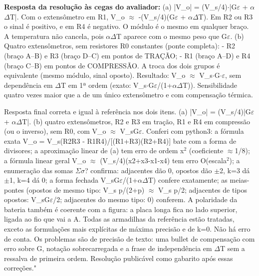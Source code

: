\documentclass{article}%
\begin{document}
\textbf{Resposta da resolução às cegas do avaliador:} (a) |V\_o| = (V\_s/4)$\cdot$|G$\varepsilon$ + $\alpha$$\Delta$T|. Com o extensômetro em R1, V\_o $\approx$ -(V\_s/4)(G$\varepsilon$ + $\alpha$$\Delta$T). Em R2 ou R3 o sinal é positivo, e em R4 é negativo. O módulo é o mesmo em qualquer braço. A temperatura não cancela, pois $\alpha$$\Delta$T aparece com o mesmo peso que G$\varepsilon$.\newline%
\newline%
(b) Quatro extensômetros, sem resistores R0 constantes (ponte completa):\newline%
{-} R2 (braço A--B) e R3 (braço D--C) em pontos de TRAÇÃO;\newline%
{-} R1 (braço A--D) e R4 (braço C--B) em pontos de COMPRESSÃO.\newline%
A troca dos dois grupos é equivalente (mesmo módulo, sinal oposto).\newline%
Resultado: V\_o $\approx$ V\_s$\cdot$G$\cdot$$\varepsilon$, sem dependência em $\Delta$T em 1ª ordem (exato: V\_s$\cdot$G$\varepsilon$/(1+$\alpha$$\Delta$T)). Sensibilidade quatro vezes maior que a de um único extensômetro e com compensação térmica.\par %
Resposta final correta e igual à referência nos dois itens. (a) |V\_o| = (V\_s/4)|G$\varepsilon$ + $\alpha$$\Delta$T|. (b) quatro extensômetros, R2 e R3 em tração, R1 e R4 em compressão (ou o inverso), sem R0, com V\_o $\approx$ V\_sG$\varepsilon$. Conferi com python3: a fórmula exata V\_o = V\_s(R2R3 - R1R4)/{[}(R1+R3)(R2+R4){]} bate com a forma de divisores; a aproximação linear de (a) tem erro de ordem x$^2$ (coeficiente $\approx$1/8); a fórmula linear geral V\_o $\approx$ (V\_s/4)(x2+x3-x1-x4) tem erro O(escala$^2$); a enumeração das somas $\Sigma$$\sigma$? confirma: adjacentes dão 0, opostos dão $\pm$2, k=3 dá $\pm$1, k=4 dá 0; a forma fechada V\_sG$\varepsilon$/(1+$\alpha$$\Delta$T) confere exatamente; as meias{-}pontes (opostos de mesmo tipo: V\_s p/(2+p) $\approx$ V\_s p/2; adjacentes de tipos opostos: V\_sG$\varepsilon$/2; adjacentes do mesmo tipo: 0) conferem. A polaridade da bateria também é coerente com a figura: a placa longa fica no lado superior, ligada ao fio que vai a A. Todas as armadilhas da referência estão tratadas, exceto as formulações mais explícitas de máxima precisão e de k=0. Não há erro de conta. Os problemas são de precisão de texto: uma bullet de compensação com erro sobre G, notação sobrecarregada e a frase de independência em $\Delta$T sem a ressalva de primeira ordem. Resolução publicável como gabarito após essas correções."%
\end{document}
